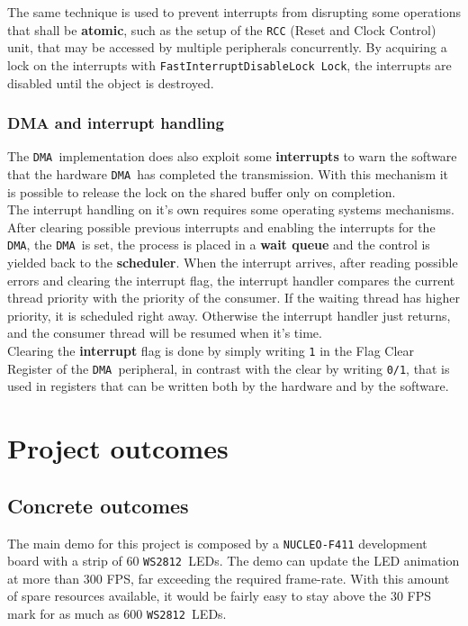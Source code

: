 \documentclass[10pt,a4]{article}
\newcommand{\ws}{\texttt{WS2812 }}
\newcommand{\dma}{\texttt{DMA }}
\begin{document}
The same technique is used to prevent interrupts from disrupting some operations that shall be \textbf{atomic}, such as the setup of the \texttt{RCC} (Reset and Clock Control) unit, that may be accessed by multiple peripherals concurrently. By acquiring a lock on the interrupts with \lstinline{FastInterruptDisableLock Lock}, the interrupts are disabled until the object is destroyed.


\subsubsection{DMA and interrupt handling}
The \dma implementation does also exploit some \textbf{interrupts} to warn the software that the hardware \dma has completed the transmission. With this mechanism it is possible to release the lock on the shared buffer only on completion.\\

The interrupt handling on it's own requires some operating systems mechanisms. After clearing possible previous interrupts and enabling the interrupts for the \texttt{DMA}, the \dma is set, the process is placed in a \textbf{wait queue} and the control is yielded back to the \textbf{scheduler}. When the interrupt arrives, after reading possible errors and clearing the interrupt flag, the interrupt handler compares the current thread priority with the priority of the consumer. If the waiting thread has higher priority, it is scheduled right away. Otherwise the interrupt handler just returns, and the consumer thread will be resumed when it's time.\\

Clearing the \textbf{interrupt} flag is done by simply writing \texttt{1} in the Flag Clear Register of the \dma peripheral, in contrast with the clear by writing \texttt{0/1}, that is used in registers that can be written both by the hardware and by the software.

\clearpage

\section{Project outcomes}

\subsection{Concrete outcomes}
The main demo for this project is composed by a \texttt{NUCLEO-F411} development board with a strip of 60 \ws LEDs. The demo can update the LED animation at more than 300 FPS, far exceeding the required frame-rate. With this amount of spare resources available, it would be fairly easy to stay above the 30 FPS mark for as much as 600 \ws LEDs.
\end{document}
